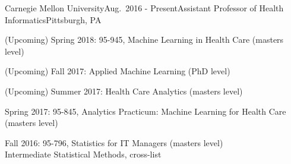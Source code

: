 \begin{rSubsection}{Carnegie Mellon University}{Aug.\ 2016 - Present}{Assistant Professor of Health Informatics}{Pittsburgh, PA}
\item (Upcoming) Spring 2018: 95-945, Machine Learning in Health Care (masters level)
\item (Upcoming) Fall 2017: Applied Machine Learning (PhD level)
\item (Upcoming) Summer 2017: Health Care Analytics (masters level)
\item Spring 2017: 95-845, Analytics Practicum: Machine Learning for Health Care (masters level)
\item Fall 2016: 95-796, Statistics for IT Managers (masters level)
\\ \qquad Intermediate Statistical Methods, cross-list
\end{rSubsection}







